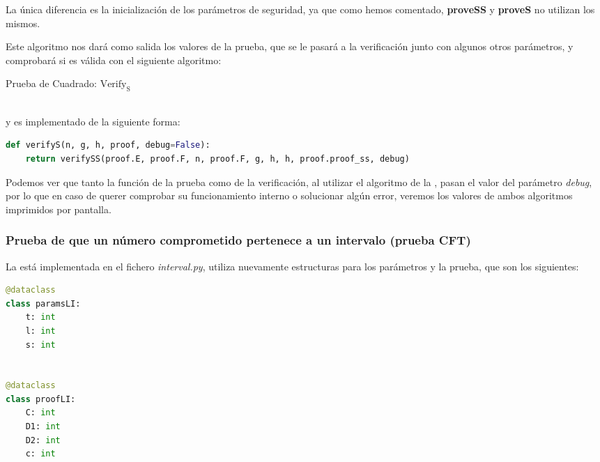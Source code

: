 La única diferencia es la inicialización de los parámetros de seguridad, ya que como hemos comentado, \textbf{proveSS} y \textbf{proveS} no utilizan los mismos.

Este algoritmo nos dará como salida los valores de la prueba, que se le pasará a la verificación junto con algunos otros parámetros, y comprobará si es válida con el siguiente algoritmo: \\
\begin{minipage}{0.9\textwidth}
    \begin{algorithm}[H]
        \caption{Prueba de Cuadrado: $\operatorname{Verify_{S}}$}
    \end{algorithm}
\end{minipage} \\
y es implementado de la siguiente forma:
\begin{lstlisting}[language=Python, basicstyle=\footnotesize]
def verifyS(n, g, h, proof, debug=False):
    return verifySS(proof.E, proof.F, n, proof.F, g, h, h, proof.proof_ss, debug)
\end{lstlisting}

Podemos ver que tanto la función de la prueba como de la verificación, al utilizar el algoritmo de la , pasan el valor del parámetro \textit{debug}, por lo que en caso de querer comprobar su funcionamiento interno o solucionar algún error, veremos los valores de ambos algoritmos imprimidos por pantalla.

\subsubsection{Prueba de que un número comprometido pertenece a un intervalo (prueba CFT)}

La  está implementada en el fichero \emph{interval.py}, utiliza nuevamente estructuras para los parámetros y la prueba, que son los siguientes:
\begin{lstlisting}[language=Python, basicstyle=\footnotesize]
@dataclass
class paramsLI:
    t: int
    l: int
    s: int


@dataclass
class proofLI:
    C: int
    D1: int
    D2: int
    c: int
\end{lstlisting}

